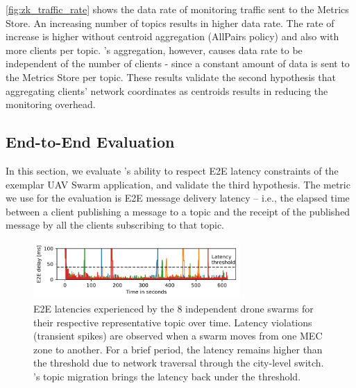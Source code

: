 \cref{fig:zk_traffic_rate} shows the data rate of monitoring traffic sent to the Metrics Store. An increasing number of topics results in higher data rate. The rate of increase is higher without centroid aggregation (AllPairs policy) and also with more clients per topic. \epulsar's aggregation, however, causes data rate to be independent of the number of clients - since a constant amount of data is sent to the Metrics Store per topic. These results validate the second hypothesis that aggregating clients' network coordinates as centroids results in reducing the monitoring overhead.

\subsection{End-to-End Evaluation}
In this section, we evaluate \epulsar's ability to respect E2E latency constraints of the exemplar UAV Swarm application, and validate the third hypothesis. The metric we use for the evaluation is E2E message delivery latency -- i.e., the elapsed time between a client publishing a message to a topic and the receipt of the published message by all the clients subscribing to that topic.

\begin{figure}[!t]
    \centering
    \includegraphics[width=0.7\textwidth]{figures/epulsar/evals/e2e_delays_swarm_combined.pdf}
    \caption{E2E latencies experienced by the 8 independent drone swarms for their respective representative topic over time. Latency violations (transient spikes) are observed when a swarm moves from one MEC zone to another.  For a brief period, the latency remains higher than the threshold due to network traversal through the city-level switch. \epulsar's topic migration brings the latency back under the threshold.}
    \label{fig:e2e_drone_swarm_aggr}
\end{figure}

